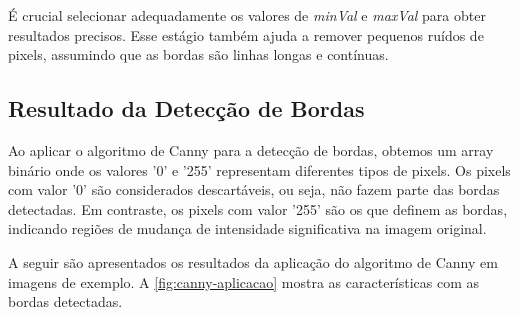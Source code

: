 
É crucial selecionar adequadamente os valores de \textit{minVal} e \textit{maxVal} para obter resultados precisos. Esse estágio também ajuda a remover pequenos ruídos de pixels, assumindo que as bordas são linhas longas e contínuas.

\subsection{Resultado da Detecção de Bordas}
\label{sec:resultado-deteccao-bordas}

Ao aplicar o algoritmo de Canny para a detecção de bordas, obtemos um array binário onde os valores '0' e '255' representam diferentes tipos de pixels. Os pixels com valor '0' são considerados descartáveis, ou seja, não fazem parte das bordas detectadas. Em contraste, os pixels com valor '255' são os que definem as bordas, indicando regiões de mudança de intensidade significativa na imagem original.

A seguir são apresentados os resultados da aplicação do algoritmo de Canny em imagens de exemplo. A \autoref{fig:canny-aplicacao} mostra as características com as bordas detectadas.


